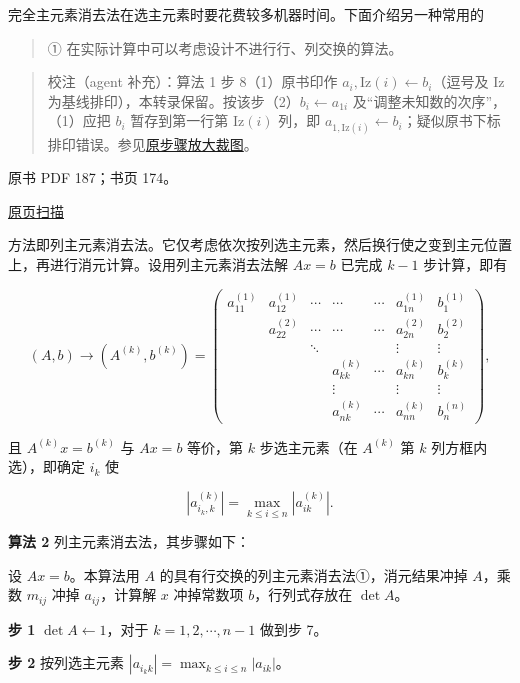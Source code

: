 \documentclass[
  10pt,
  fontset=fandol]{ctexart}
\begin{document}
完全主元素消去法在选主元素时要花费较多机器时间。下面介绍另一种常用的

\begin{quote}
① 在实际计算中可以考虑设计不进行行、列交换的算法。
\end{quote}

\begin{quote}
校注（agent 补充）：算法 1 步 8（1）原书印作 \(a_i,\mathrm{Iz}(i)\leftarrow b_i\)（逗号及 Iz 为基线排印），本转录保留。按该步（2）\(b_i\leftarrow a_{1i}\) 及``调整未知数的次序''，（1）应把 \(b_i\) 暂存到第一行第 \(\mathrm{Iz}(i)\) 列，即 \(a_{1,\mathrm{Iz}(i)}\leftarrow b_i\)；疑似原书下标排印错误。参见\href{../../../staging/ch07a/assets/pdf-186-step8-detail.png}{原步骤放大裁图}。
\end{quote}

\clearpage

原书 PDF 187；书页 174。

\href{../../../source-images/pdf-187.jpeg}{原页扫描}

方法即列主元素消去法。它仅考虑依次按列选主元素，然后换行使之变到主元位置上，再进行消元计算。设用列主元素消去法解 \(Ax=b\) 已完成 \(k-1\) 步计算，即有

\[
(A,b)\to(A^{(k)},b^{(k)})=
\left(\begin{array}{cccccc|c}
a_{11}^{(1)}&a_{12}^{(1)}&\cdots&\cdots&\cdots&a_{1n}^{(1)}&b_1^{(1)}\\
&a_{22}^{(2)}&\cdots&\cdots&\cdots&a_{2n}^{(2)}&b_2^{(2)}\\
&&\ddots&&&\vdots&\vdots\\
&&&a_{kk}^{(k)}&\cdots&a_{kn}^{(k)}&b_k^{(k)}\\
&&&\vdots&&\vdots&\vdots\\
&&&a_{nk}^{(k)}&\cdots&a_{nn}^{(k)}&b_n^{(n)}
\end{array}\right),
\]

且 \(A^{(k)}x=b^{(k)}\) 与 \(Ax=b\) 等价，第 \(k\) 步选主元素（在 \(A^{(k)}\) 第 \(k\) 列方框内选），即确定 \(i_k\) 使

\[|a_{i_k,k}^{(k)}|=\max_{k\le i\le n}|a_{ik}^{(k)}|.\]

\textbf{算法 2} 列主元素消去法，其步骤如下：

设 \(Ax=b\)。本算法用 \(A\) 的具有行交换的列主元素消去法①，消元结果冲掉 \(A\)，乘数 \(m_{ij}\) 冲掉 \(a_{ij}\)，计算解 \(x\) 冲掉常数项 \(b\)，行列式存放在 \(\det A\)。

\textbf{步 1} \(\det A\leftarrow1\)，对于 \(k=1,2,\cdots,n-1\) 做到步 7。

\textbf{步 2} 按列选主元素 \(|a_{i_kk}|=\max_{k\le i\le n}|a_{ik}|\)。
\end{document}
